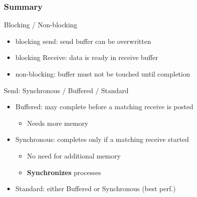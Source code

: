 \documentclass[xcolor={x11names,svgnames,psnames}]{beamer}
\begin{document}

\begin{frame}
  \frametitle{Summary}

  \begin{exampleblock}{Blocking / Non-blocking}
    \begin{itemize}
    \item blocking send: send buffer can be overwritten
    \item blocking Receive: data is ready in receive buffer
    \item non-blocking: buffer must not be touched until completion
    \end{itemize}
  \end{exampleblock}
  
  \begin{alertblock}{Send: Synchronous / Buffered / Standard}
    \begin{itemize}
    \item Buffered: may complete before a matching receive is posted
      \begin{itemize}
      \item Needs more memory
      \end{itemize}
    \item Synchronous: completes only if a matching receive started
      \begin{itemize}
      \item No need for additional memory
      \item \textbf{Synchronizes} processes
        
      \end{itemize}
    \item Standard: either Buffered or Synchronous (best perf.) 
    \end{itemize}
  \end{alertblock}
\end{frame}

\end{document}
